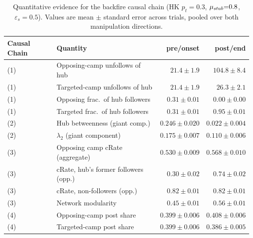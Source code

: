 \documentclass[pdflatex,sn-mathphys-num]{sn-jnl}%
\theoremstyle{thmstyleone}%
\theoremstyle{thmstyletwo}%
\theoremstyle{thmstylethree}%
\def\orange#1{#1}%
\def\Stubbornness{\mu_{\it stub}}
\def\ThofOpPreval{\varepsilon_s}
\begin{document}
\begin{table}[t]
  \tabcolsep=4pt
  \centering
  \caption{Quantitative evidence for the backfire causal chain (HK
  $p_t{=}0.3$, $\Stubbornness{=}0.8$, $\ThofOpPreval{=}0.5$). Values are mean
  $\pm$ standard error across trials, pooled over both manipulation directions.}
  \label{tab:mech_chain}
  \begin{tabular}{llrr}
    \toprule
    \orange{Causal Chain} & \orange{Quantity} & \orange{pre/onset} & \orange{post/end} \\
    \midrule
    \orange{(1)} & \orange{Opposing-camp unfollows of hub}      & \orange{$21.4 \pm 1.9$}   & \orange{$104.8 \pm 8.4$}  \\
    \orange{(1)} & \orange{Targeted-camp unfollows of hub}      & \orange{$21.4 \pm 1.9$}   & \orange{$26.3 \pm 2.1$}   \\
    \orange{(1)} & \orange{Opposing frac.\ of hub followers}    & \orange{$0.31 \pm 0.01$}  & \orange{$0.00 \pm 0.00$}  \\
    \orange{(1)} & \orange{Targeted frac.\ of hub followers}    & \orange{$0.31 \pm 0.01$}  & \orange{$0.95 \pm 0.01$}  \\
    \midrule
    \orange{(2)} & \orange{Hub betweenness (giant comp.)}     & \orange{$0.246 \pm 0.020$} & \orange{$0.022 \pm 0.004$} \\
    \orange{(2)} & \orange{$\lambda_2$ (giant component)}     & \orange{$0.175 \pm 0.007$} & \orange{$0.110 \pm 0.006$} \\
    \midrule
    \orange{(3)} & \orange{Opposing camp cRate (aggregate)}     & \orange{$0.530 \pm 0.009$} & \orange{$0.568 \pm 0.010$} \\
    \orange{(3)} & \orange{cRate, hub's former followers (opp.)}& \orange{$0.30 \pm 0.02$}   & \orange{$0.74 \pm 0.02$}   \\
    \orange{(3)} & \orange{cRate, non-followers (opp.)}         & \orange{$0.82 \pm 0.01$}   & \orange{$0.82 \pm 0.01$}   \\
    \orange{(3)} & \orange{Network modularity}                 & \orange{$0.45 \pm 0.01$}   & \orange{$0.56 \pm 0.01$}   \\
    \midrule
    \orange{(4)} & \orange{Opposing-camp post share}           & \orange{$0.399 \pm 0.006$} & \orange{$0.408 \pm 0.006$} \\
    \orange{(4)} & \orange{Targeted-camp post share}           & \orange{$0.399 \pm 0.006$} & \orange{$0.386 \pm 0.005$} \\
    \bottomrule
  \end{tabular}
\end{table}
\end{document}
